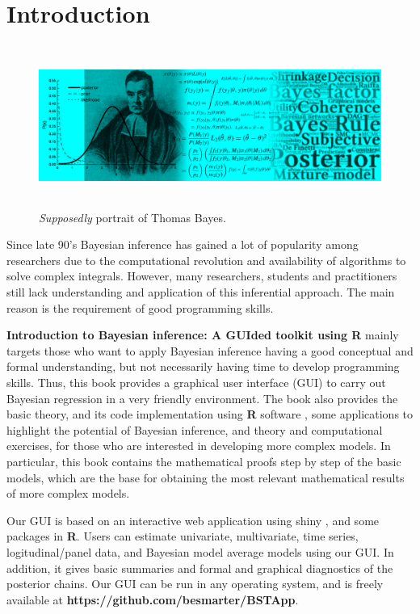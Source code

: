 \chapter*{Introduction}
\begin{figure}[h]
	\includegraphics[width=340pt, height=150pt]{frontmatter/figures/BannerBook.jpg}
	\caption[List of figure caption goes here]{\textit{Supposedly} portrait of Thomas Bayes.}\label{fig01}
\end{figure}

Since late 90’s Bayesian inference has gained a lot of popularity among researchers due to the computational revolution and availability of algorithms to solve complex integrals. However, many researchers, students and practitioners still lack understanding and application of this inferential approach. The main reason is the requirement of good programming skills.

\textbf{Introduction to Bayesian inference: A GUIded toolkit using R} mainly targets those who want to apply Bayesian inference having a good conceptual and formal understanding, but not necessarily having time to develop programming skills. Thus, this book provides a graphical user interface (GUI) to carry out Bayesian regression in a very friendly environment. The book also provides the basic theory, and its code implementation using \textbf{R} software \cite{R2021}, some applications to highlight the potential of Bayesian inference, and theory and computational exercises, for those who are interested in developing more complex models. In particular, this book contains the mathematical proofs step by step of the basic models, which are the base for obtaining the most relevant mathematical results of more complex models.

Our GUI is based on an interactive web application using shiny \cite{Chang2018}, and some packages in \textbf{R}. Users can estimate univariate, multivariate, time series, logitudinal/panel data, and Bayesian model average models using our GUI. In addition, it gives basic summaries and formal and graphical diagnostics of the posterior chains. Our GUI can be run in any operating system, and is freely available at \textbf{https://github.com/besmarter/BSTApp}. 

